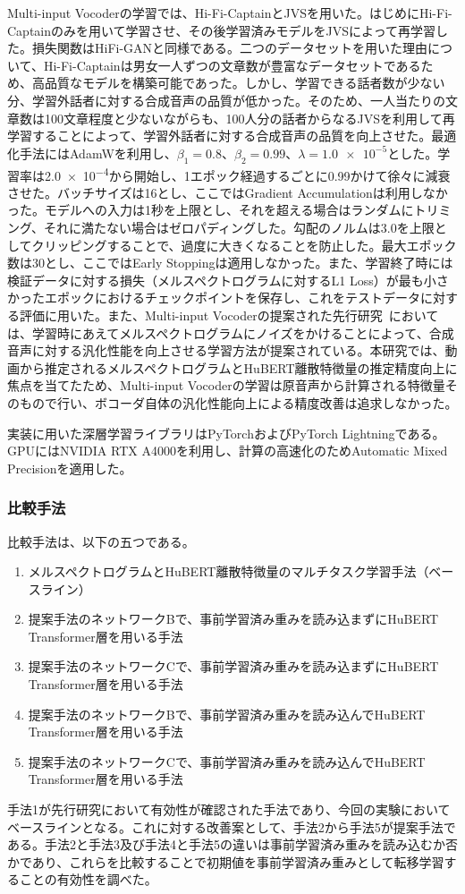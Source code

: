 \documentclass[12pt]{jarticle}
\numberwithin{equation}{section}    %
\numberwithin{figure}{section}      %
\numberwithin{table}{section}      %
\begin{document}
Multi-input Vocoderの学習では、Hi-Fi-CaptainとJVSを用いた。はじめにHi-Fi-Captainのみを用いて学習させ、その後学習済みモデルをJVSによって再学習した。損失関数はHiFi-GANと同様である。二つのデータセットを用いた理由について、Hi-Fi-Captainは男女一人ずつの文章数が豊富なデータセットであるため、高品質なモデルを構築可能であった。しかし、学習できる話者数が少ない分、学習外話者に対する合成音声の品質が低かった。そのため、一人当たりの文章数は100文章程度と少ないながらも、100人分の話者からなるJVSを利用して再学習することによって、学習外話者に対する合成音声の品質を向上させた。最適化手法にはAdamWを利用し、$\beta_{1} = 0.8$、$\beta_{2} = 0.99$、$\lambda = \num{1.0e-5}$とした。学習率は\num{2.0e-4}から開始し、1エポック経過するごとに0.99かけて徐々に減衰させた。バッチサイズは16とし、ここではGradient Accumulationは利用しなかった。モデルへの入力は1秒を上限とし、それを超える場合はランダムにトリミング、それに満たない場合はゼロパディングした。勾配のノルムは3.0を上限としてクリッピングすることで、過度に大きくなることを防止した。最大エポック数は30とし、ここではEarly Stoppingは適用しなかった。また、学習終了時には検証データに対する損失（メルスペクトログラムに対するL1 Loss）が最も小さかったエポックにおけるチェックポイントを保存し、これをテストデータに対する評価に用いた。また、Multi-input Vocoderの提案された先行研究~\cite{choi2023intelligible}においては、学習時にあえてメルスペクトログラムにノイズをかけることによって、合成音声に対する汎化性能を向上させる学習方法が提案されている。本研究では、動画から推定されるメルスペクトログラムとHuBERT離散特徴量の推定精度向上に焦点を当てたため、Multi-input Vocoderの学習は原音声から計算される特徴量そのもので行い、ボコーダ自体の汎化性能向上による精度改善は追求しなかった。

実装に用いた深層学習ライブラリはPyTorchおよびPyTorch Lightningである。GPUにはNVIDIA RTX A4000を利用し、計算の高速化のためAutomatic Mixed Precisionを適用した。

\subsubsection{比較手法}
\label{sec4:subsubsection:methods}
比較手法は、以下の五つである。
\begin{enumerate}
    \item メルスペクトログラムとHuBERT離散特徴量のマルチタスク学習手法（ベースライン）
    \item 提案手法のネットワークBで、事前学習済み重みを読み込まずにHuBERT Transformer層を用いる手法
    \item 提案手法のネットワークCで、事前学習済み重みを読み込まずにHuBERT Transformer層を用いる手法
    \item 提案手法のネットワークBで、事前学習済み重みを読み込んでHuBERT Transformer層を用いる手法
    \item 提案手法のネットワークCで、事前学習済み重みを読み込んでHuBERT Transformer層を用いる手法
\end{enumerate}
手法1が先行研究において有効性が確認された手法であり、今回の実験においてベースラインとなる。これに対する改善案として、手法2から手法5が提案手法である。手法2と手法3及び手法4と手法5の違いは事前学習済み重みを読み込むか否かであり、これらを比較することで初期値を事前学習済み重みとして転移学習することの有効性を調べた。
\end{document}
